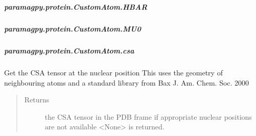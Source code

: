 \documentclass[a4paper,10pt,english]{sphinxmanual}
\begin{document}
\begin{fulllineitems}
\begin{fulllineitems}
\begin{savenotes}
\begin{longtable}{}
\\
\hline
\end{longtable}\sphinxatlongtableend\end{savenotes}


\subparagraph{paramagpy.protein.CustomAtom.HBAR}
\label{\detokenize{reference/generated/paramagpy.protein.CustomAtom.HBAR:paramagpy-protein-customatom-hbar}}\label{\detokenize{reference/generated/paramagpy.protein.CustomAtom.HBAR::doc}}

\begin{fulllineitems}
\label{\detokenize{reference/generated/paramagpy.protein.CustomAtom.HBAR:paramagpy.protein.CustomAtom.HBAR}}
\end{fulllineitems}



\subparagraph{paramagpy.protein.CustomAtom.MU0}
\label{\detokenize{reference/generated/paramagpy.protein.CustomAtom.MU0:paramagpy-protein-customatom-mu0}}\label{\detokenize{reference/generated/paramagpy.protein.CustomAtom.MU0::doc}}

\begin{fulllineitems}
\label{\detokenize{reference/generated/paramagpy.protein.CustomAtom.MU0:paramagpy.protein.CustomAtom.MU0}}
\end{fulllineitems}



\subparagraph{paramagpy.protein.CustomAtom.csa}
\label{\detokenize{reference/generated/paramagpy.protein.CustomAtom.csa:paramagpy-protein-customatom-csa}}\label{\detokenize{reference/generated/paramagpy.protein.CustomAtom.csa::doc}}

\begin{fulllineitems}
\label{\detokenize{reference/generated/paramagpy.protein.CustomAtom.csa:paramagpy.protein.CustomAtom.csa}}
Get the CSA tensor at the nuclear position
This uses the geometry of neighbouring atoms
and a standard library from Bax J. Am. Chem. Soc. 2000
\begin{quote}\begin{description}
\item[{Returns}] \leavevmode
{} \textendash{} the CSA tensor in the PDB frame
if appropriate nuclear positions are not
available \textless{}None\textgreater{} is returned.


\end{description}
\end{quote}
\end{fulllineitems}
\end{fulllineitems}
\end{fulllineitems}
\end{document}
